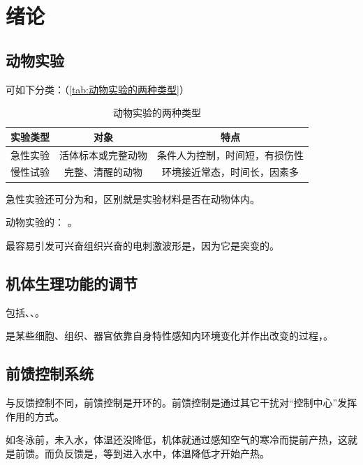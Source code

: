 \section{绪论}

\subsection{动物实验}

可如下分类：（\autoref{tab:动物实验的两种类型}）

\begin{table}[htbp]
	\centering
	\begin{tabularx}{\textwidth}{|c|c|C|}
		\hline
		\textbf{实验类型} & \textbf{对象} & \textbf{特点} \\ \hline
		急性实验 & 活体标本或完整动物 & 条件人为控制，时间短，有损伤性 \\ \hline
		慢性试验 & 完整、清醒的动物 & 环境接近常态，时间长，因素多 \\ \hline
	\end{tabularx}
	\caption{动物实验的两种类型}
	\label{tab:动物实验的两种类型}
\end{table}

急性实验还可分为和，区别就是实验材料是否在动物体内。

动物实验的：	。

最容易引发可兴奋组织兴奋的电刺激波形是，因为它是突变的。

\subsection{机体生理功能的调节}

包括、、。

是某些细胞、组织、器官依靠自身特性感知内环境变化并作出改变的过程，。

\subsection{前馈控制系统}

与反馈控制不同，前馈控制是开环的。前馈控制是通过其它干扰对“控制中心”发挥作用的方式。

如冬泳前，未入水，体温还没降低，机体就通过感知空气的寒冷而提前产热，这就是前馈。而负反馈是，等到进入水中，体温降低才开始产热。

